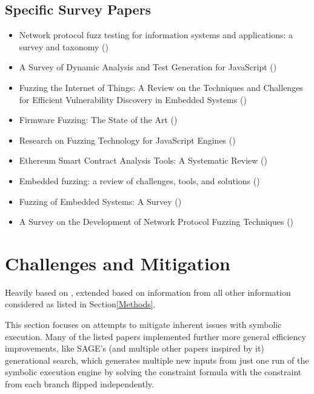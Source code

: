 \documentclass{article}
\begin{document}
\begin{multicols}{2}
    \subsection{Specific Survey Papers}
    \begin{itemize}
        \item    Network protocol fuzz testing for information systems and applications: a survey and taxonomy ()\cite{Network}
        \item    A Survey of Dynamic Analysis and Test Generation for JavaScript ()\cite{JavaScript2}
        \item    Fuzzing the Internet of Things: A Review on the Techniques and Challenges for Efficient Vulnerability Discovery in Embedded Systems ()\cite{IoT}
        \item    Firmware Fuzzing: The State of the Art ()\cite{Firmware}
        \item    Research on Fuzzing Technology for JavaScript Engines ()\cite{JavaScript}
        \item    Ethereum Smart Contract Analysis Tools: A Systematic Review ()\cite{Ethereum}
        \item    Embedded fuzzing: a review of challenges, tools, and solutions ()\cite{Embedded2}
        \item    Fuzzing of Embedded Systems: A Survey ()\cite{Embedded}
        \item    A Survey on the Development of Network Protocol Fuzzing Techniques ()\cite{Network2023}
    \end{itemize}

    \section{Challenges and Mitigation}
    \label{Results}
    Heavily based on \cite{ReviewThreeDecades, PreliminaryAssessment}, extended based on information from all other information considered as listed in Section\ref{Methods}.

    This section focuses on attempts to mitigate inherent issues with symbolic execution. Many of the listed papers implemented further more general efficiency improvements, like SAGE's\cite{SAGE} (and multiple other papers inspired by it) generational search, which generates multiple new inputs from just one run of the symbolic execution engine by solving the constraint formula with the constraint from each branch flipped independently.


\end{multicols}
\end{document}
